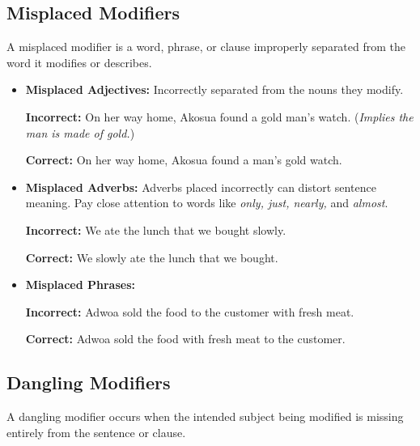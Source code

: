 \documentclass[11pt, a4paper]{article}
\begin{document}
\subsection{Misplaced Modifiers}
A misplaced modifier is a word, phrase, or clause improperly separated from the word it modifies or describes.
\begin{itemize}
    \item \textbf{Misplaced Adjectives:} Incorrectly separated from the nouns they modify.
    \begin{mdframed}[style=incorrectbox]
        \textbf{Incorrect:} On her way home, Akosua found a gold man's watch. (\textit{Implies the man is made of gold.})
    \end{mdframed}
    \begin{mdframed}[style=correctbox]
        \textbf{Correct:} On her way home, Akosua found a man's gold watch.
    \end{mdframed}
    
    \item \textbf{Misplaced Adverbs:} Adverbs placed incorrectly can distort sentence meaning. Pay close attention to words like \textit{only, just, nearly,} and \textit{almost}.
    \begin{mdframed}[style=incorrectbox]
        \textbf{Incorrect:} We ate the lunch that we bought slowly.
    \end{mdframed}
    \begin{mdframed}[style=correctbox]
        \textbf{Correct:} We slowly ate the lunch that we bought.
    \end{mdframed}

    \item \textbf{Misplaced Phrases:}
    \begin{mdframed}[style=incorrectbox]
        \textbf{Incorrect:} Adwoa sold the food to the customer with fresh meat.
    \end{mdframed}
    \begin{mdframed}[style=correctbox]
        \textbf{Correct:} Adwoa sold the food with fresh meat to the customer.
    \end{mdframed}
\end{itemize}

\subsection{Dangling Modifiers}
A dangling modifier occurs when the intended subject being modified is missing entirely from the sentence or clause.
\end{document}
